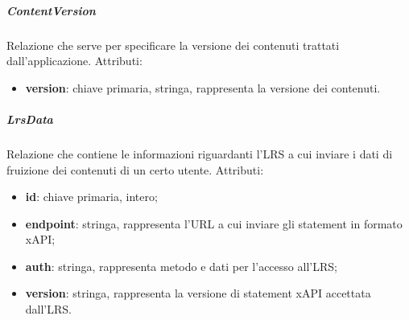\documentclass[../Tesi.tex]{subfiles}
\begin{document}
				\subparagraph*{ContentVersion}
				Relazione che serve per specificare la versione dei contenuti trattati dall'applicazione. Attributi:
				\begin{itemize}
					\item \textbf{version}: chiave primaria, stringa, rappresenta la versione dei contenuti.
				\end{itemize}

				\subparagraph*{LrsData}
				Relazione che contiene le informazioni riguardanti l'LRS a cui inviare i dati di fruizione dei contenuti di un certo utente. Attributi:
				\begin{itemize}
					\item \textbf{id}: chiave primaria, intero;
					\item \textbf{endpoint}: stringa, rappresenta l'URL a cui inviare gli statement in formato xAPI;
					\item \textbf{auth}: stringa, rappresenta metodo e dati per l'accesso all'LRS;
					\item \textbf{version}: stringa, rappresenta la versione di statement xAPI accettata dall'LRS.
				\end{itemize}
\end{document}
